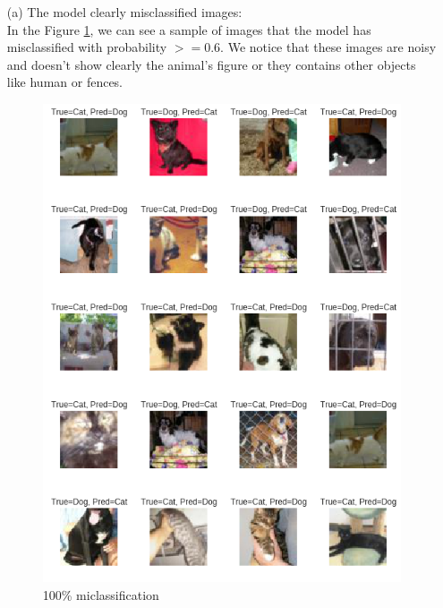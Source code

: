 \documentclass[a4paper]{article}
\begin{document}
\begin{itemize}
	\item[(a)] The model clearly misclassified images:\\
	In the Figure \ref{fig:100misclass}, we can see a sample of images that the model has misclassified with probability $>= 0.6$.
	We notice that these images are noisy and doesn't show clearly the animal's figure or they contains other objects like human or fences.
	\begin{figure}[h!]
		\centering
		\includegraphics[scale=.36]{100misclass.png}
		\caption{100\% miclassification}
		\label{fig:100misclass}
	\end{figure}
%
\begin{figure}[h!]
	\centering

\end{figure}
\end{itemize}
\end{document}
